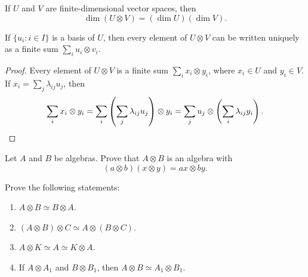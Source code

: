 If $U$ and $V$ are finite-dimensional vector spaces, then 
\[
	\dim(U\otimes V)=(\dim U)(\dim V).
\]

\begin{corollary}
	If $\{u_i:i\in I\}$ is a basis of $U$, then every element of $U\otimes V$
	can be written uniquely as a finite sum $\sum_{i}u_i\otimes v_i$.
\end{corollary}

\begin{proof}
	Every element of $U\otimes V$ is a finite sum 
	$\sum_i x_i\otimes y_i$, where $x_i\in U$ and $y_i\in V$. If  
	$x_i=\sum_j\lambda_{ij}u_j$, then 
	\[
		\sum_i x_i\otimes y_i=\sum_i\left(\sum_j\lambda_{ij}u_j\right)\otimes y_i		
		=\sum_j u_j\otimes\left(\sum_i\lambda_{ij}y_i\right).\qedhere 
	\]
\end{proof}

%

\begin{exercise}
\label{xca:tensor_algebras}
    Let $A$ and $B$ be algebras. Prove that $A\otimes B$ 
    is an algebra with 
	\[
		(a\otimes b)(x\otimes y)=ax\otimes by.
	\]
\end{exercise}


\begin{exercise}
    Prove the following statements:
	\begin{enumerate}
		\item $A\otimes B\simeq B\otimes A$.
		\item $(A\otimes B)\otimes C\simeq A\otimes(B\otimes C)$.
		\item $A\otimes K\simeq A\simeq K\otimes A$.
		\item If $A\otimes A_1$ and $B\otimes B_1$, then $A\otimes B\simeq A_1\otimes B_1$.
	\end{enumerate}
\end{exercise}

